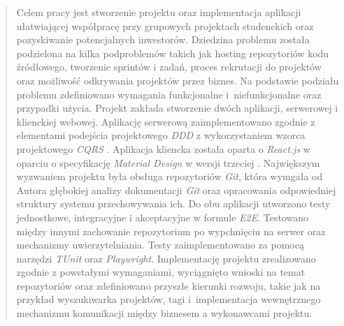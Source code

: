 \begin{abstract}
Celem pracy jest stworzenie projektu oraz implementacja aplikacji ułatwiającej współpracę przy grupowych projektach studenckich oraz pozyskiwanie potencjalnych inwestorów.
Dziedzina problemu została podzielona na kilka podproblemów takich jak hosting repozytoriów kodu źródłowego, tworzenie sprintów i zadań,
proces rekrutacji do projektów oraz możliwość odkrywania projektów przez biznes. Na podstawie podziału problemu zdefiniowano wymagania funkcjonalne i~niefunkcjonalne oraz przypadki użycia.
Projekt zakłada stworzenie dwóch aplikacji, serwerowej i klienckiej webowej.
Aplikację serwerową zaimplementowano zgodnie z elementami podejścia projektowego \textit{DDD} \cite{evans2015domain} z wykorzystaniem wzorca projektowego \textit{CQRS} \cite{CQRS}.
Aplikacja kliencka została oparta o \textit{React.js} w oparciu o specyfikację \textit{Material Design} w wersji trzeciej \cite{MaterialDesign}. Największym wyzwaniem projektu była obsługa repozytoriów \textit{Git},
która wymgała od Autora głębokiej analizy dokumentacji \textit{Git} oraz opracowania odpowiedniej struktury systemu przechowywania ich. 
Do obu aplikacji utworzono testy jednostkowe, integracyjne i akceptacyjne w formule \textit{E2E}. Testowano między innymi zachowanie repozytorium po wypchnięciu na serwer
oraz mechanizmy uwierzytelniania. Testy zaimplementowano za pomocą narzędzi \textit{TUnit} oraz \textit{Playwright}.
Implementację projektu zrealizowano zgodnie z powstałymi wymaganiami, wyciągnięto wnioski na temat repozytoriów oraz zdefiniowano przyszłe kierunki rozwoju,
takie jak na przykład wyszukiwarka projektów, tagi i~implementacja wewnętrznego mechanizmu komunikacji między biznesem a wykonawcami projektu. 
\end{abstract}
\mykeywords

